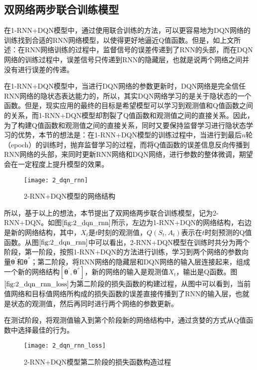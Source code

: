 \subsection{双网络两步联合训练模型}
在1-RNN+DQN模型中，通过使用联合训练的方法，可以更容易地为DQN网络的训练找到合适的RNN网络模型，以使得更好地逼近Q值函数。但是，如上文所述：在RNN网络训练的过程中，监督信号的误差传递到了RNN的头部，而在DQN网络的训练过程中，误差信号只传递到RNN的隐藏层，也就是说两个网络之间并没有进行误差的传递。

在1-RNN+DQN模型中，当进行DQN网络的参数更新时，DQN网络是完全信任RNN网络的隐状态表达能力的，所以，其实DQN网络学习的是关于隐状态的一个函数。但是，现实应用的最终的目标是希望模型可以学习到观测值和Q值函数之间的关系，而1-RNN+DQN模型却割裂了Q值函数和观测值之间的直接关系。因此，为了构建Q值函数和观测值之间的直接关系，同时又要保持监督学习进行隐状态学习的优势，本节的想法是：在1-RNN+DQN模型的训练过程中，当进行到最后$n$轮（epoch）的训练时，抛弃监督学习的过程，而将Q值函数的误差信息反向传播到RNN网络的头部，来同时更新RNN网络和DQN网络，进行参数的整体微调，期望会在一定程度上提升模型的效果。

\begin{figure}[htbp]
\centering
\texttt{[image: 2\_dqn\_rnn]}
\caption{2-RNN+DQN模型的网络结构}
\label{fig:2_dqn_rnn}
\end{figure}

所以，基于以上的想法，本节提出了双网络两步联合训练模型，记为2-RNN+DQN。如图$\ref{fig:2_dqn_rnn}$所示，左边为1-RNN+DQN的网络结构，右边是新的网络结构，其中，$X_{t}$是$t$时刻的观测值，$Q(S_{t},A_{t})$表示在$t$时刻预测的Q值函数。从图$\ref{fig:2_dqn_rnn}$中可以看出，2-RNN+DQN模型在训练时共分为两个阶段，第一阶段，按照1-RNN+DQN的方法进行训练，学习到两个网络的参数向量$\bm{\theta}^{'}$和$\bm{\theta}^{''}$；第二阶段，将RNN网络的隐藏层和DQN网络的输入层连接起来，组成一个新的网络结构$[\bm{\theta}^{'},\bm{\theta}^{''}]$，新的网络的输入是观测值$X_{t}$，输出是Q函数。图$\ref{fig:2_dqn_rnn_loss}$为第二阶段的损失函数的构建过程，从图中可以看到，当前值网络和目标值网络所构成的损失函数的误差直接传播到了RNN的输入层，也就是状态的观测值，然后再同时进行两个网络的参数更新。

在测试阶段，将观测值输入到第个阶段新的网络结构中，通过贪婪的方式从Q值函数中选择最佳的行为。


\begin{figure}[htbp]
\centering
\texttt{[image: 2\_dqn\_rnn\_loss]}
\caption{2-RNN+DQN模型第二阶段的损失函数构造过程}
\label{fig:2_dqn_rnn_loss}
\end{figure}

